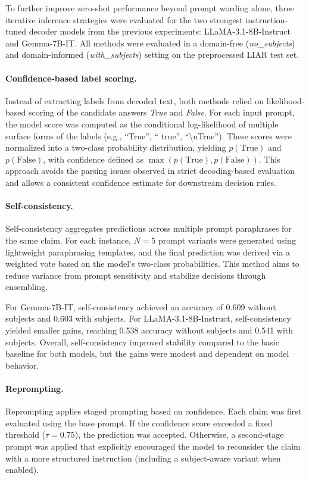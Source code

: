 To further improve zero-shot performance beyond prompt wording alone, three iterative inference strategies were evaluated for the two strongest instruction-tuned decoder models from the previous experiments: LLaMA-3.1-8B-Instruct and Gemma-7B-IT. All methods were evaluated in a domain-free (\textit{no\_subjects}) and domain-informed (\textit{with\_subjects}) setting on the preprocessed LIAR test set.

\paragraph{Confidence-based label scoring.}
Instead of extracting labels from decoded text, both methods relied on likelihood-based scoring of the candidate answers \textit{True} and \textit{False}. For each input prompt, the model score was computed as the conditional log-likelihood of multiple surface forms of the labels (e.g., ``True'', `` true'', ``\textbackslash nTrue''). These scores were normalized into a two-class probability distribution, yielding $p(\text{True})$ and $p(\text{False})$, with confidence defined as $\max(p(\text{True}), p(\text{False}))$. This approach avoids the parsing issues observed in strict decoding-based evaluation and allows a consistent confidence estimate for downstream decision rules.

\paragraph{Self-consistency.}
Self-consistency aggregates predictions across multiple prompt paraphrases for the same claim. For each instance, $N=5$ prompt variants were generated using lightweight paraphrasing templates, and the final prediction was derived via a weighted vote based on the model's two-class probabilities. This method aims to reduce variance from prompt sensitivity and stabilize decisions through ensembling.

For Gemma-7B-IT, self-consistency achieved an accuracy of 0.609 without subjects and 0.603 with subjects. For LLaMA-3.1-8B-Instruct, self-consistency yielded smaller gains, reaching 0.538 accuracy without subjects and 0.541 with subjects. Overall, self-consistency improved stability compared to the basic baseline for both models, but the gains were modest and dependent on model behavior.

\paragraph{Reprompting.}
Reprompting applies staged prompting based on confidence. Each claim was first evaluated using the base prompt. If the confidence score exceeded a fixed threshold ($\tau = 0.75$), the prediction was accepted. Otherwise, a second-stage prompt was applied that explicitly encouraged the model to reconsider the claim with a more structured instruction (including a subject-aware variant when enabled).

